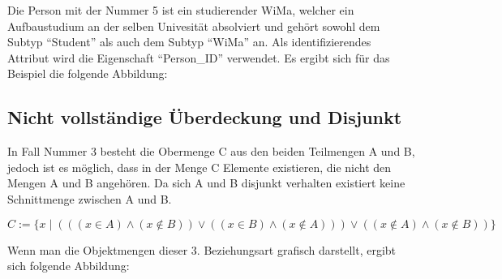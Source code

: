           Die Person mit der Nummer 5 ist ein studierender WiMa, welcher ein Aufbaustudium an der selben Univesität absolviert und gehört sowohl dem Subtyp \enquote{Student} als auch dem Subtyp \enquote{WiMa} an. Als identifizierendes Attribut wird die Eigenschaft \enquote{Person\_ID} verwendet. Es ergibt sich für das Beispiel die folgende Abbildung:
          \begin{center}
          \end{center}
\vspace{\baselineskip}
          \begin{center}
          \end{center}
      \subsection{Nicht vollständige Überdeckung und Disjunkt}
        In Fall Nummer 3 besteht die Obermenge C aus den beiden Teilmengen A und B, jedoch ist es möglich, dass in der Menge C Elemente existieren, die nicht den Mengen A und B angehören. Da sich A und B disjunkt verhalten existiert keine Schnittmenge zwischen A und B.

        $C := \{x \mid (((x \in A) \wedge (x \notin B)) \vee ((x \in B) \wedge (x \notin A))) \vee ((x \notin A) \wedge (x \notin B))\}$

        Wenn man die Objektmengen dieser 3. Beziehungsart grafisch darstellt, ergibt sich folgende Abbildung:

